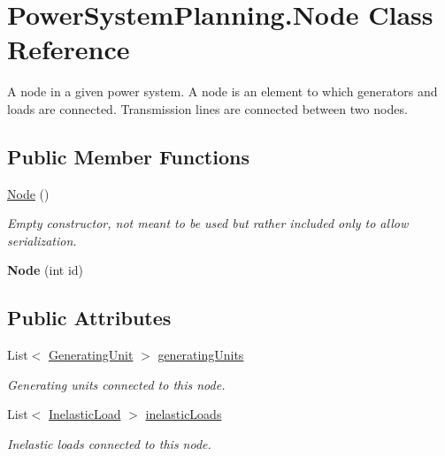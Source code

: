 \hypertarget{class_power_system_planning_1_1_node}{}\section{Power\+System\+Planning.\+Node Class Reference}
\label{class_power_system_planning_1_1_node}


A node in a given power system. A node is an element to which generators and loads are connected. Transmission lines are connected between two nodes.  


\subsection*{Public Member Functions}
\begin{DoxyCompactItemize}
\item 
\hyperlink{class_power_system_planning_1_1_node_a7c7b4c8b9e85f023e7cc2c4ea9548bcc}{Node} ()
\begin{DoxyCompactList}\small\item\em Empty constructor, not meant to be used but rather included only to allow serialization. \end{DoxyCompactList}\item 
{\bfseries Node} (int id)\hypertarget{class_power_system_planning_1_1_node_ac50142b7f7bbed2ab7ebd645596a0d03}{}\label{class_power_system_planning_1_1_node_ac50142b7f7bbed2ab7ebd645596a0d03}

\end{DoxyCompactItemize}
\subsection*{Public Attributes}
\begin{DoxyCompactItemize}
\item 
List$<$ \hyperlink{class_power_system_planning_1_1_generating_unit}{Generating\+Unit} $>$ \hyperlink{class_power_system_planning_1_1_node_a8b0943967935c496d57afbd76b12706c}{generating\+Units}
\begin{DoxyCompactList}\small\item\em Generating units connected to this node. \end{DoxyCompactList}\item 
List$<$ \hyperlink{class_power_system_planning_1_1_inelastic_load}{Inelastic\+Load} $>$ \hyperlink{class_power_system_planning_1_1_node_a4cc33a77151060a8eb42d879017733da}{inelastic\+Loads}
\begin{DoxyCompactList}\small\item\em Inelastic loads connected to this node. \end{DoxyCompactList}\end{DoxyCompactItemize}
